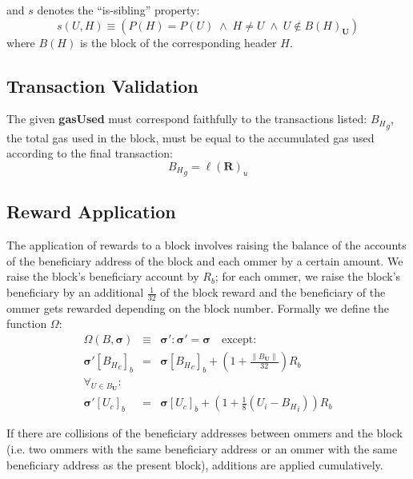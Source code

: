 \documentclass[9pt,oneside]{amsart}
\begin{document}
\begin{multicols}{2}
and $s$ denotes the ``is-sibling'' property:
\begin{equation}
s(U, H) \equiv (P(H) = P(U)\; \wedge \; H \neq U \; \wedge \; U \notin B(H)_\mathbf{U})
\end{equation}
where $B(H)$ is the block of the corresponding header $H$.

\subsection{Transaction Validation}


The given \textbf{gasUsed} must correspond faithfully to the transactions listed: ${B_H}_g$, the total gas used in the block, must be equal to the accumulated gas used according to the final transaction:
\begin{equation}
{B_H}_g = \ell(\mathbf{R})_u
\end{equation}

\subsection{Reward Application}

The application of rewards to a block involves raising the balance of the accounts of the beneficiary address of the block and each ommer by a certain amount. We raise the block's beneficiary account by $R_b$; for each ommer, we raise the block's beneficiary by an additional $\frac{1}{32}$ of the block reward and the beneficiary of the ommer gets rewarded depending on the block number. Formally we define the function $\Omega$:
\begin{eqnarray}
\Omega(B, \boldsymbol{\sigma}) & \equiv & \boldsymbol{\sigma}': \boldsymbol{\sigma}' = \boldsymbol{\sigma} \quad \text{except:} \\
\boldsymbol{\sigma}'[{B_H}_c]_b & = & \boldsymbol{\sigma}[{B_H}_c]_b + (1 + \frac{\lVert B_\mathbf{U}\rVert}{32})R_b \\
\forall_{U \in B_\mathbf{U}}: \\ \nonumber
 \boldsymbol{\sigma}'[U_c]_b & = & \boldsymbol{\sigma}[U_c]_b + (1 + \frac{1}{8} (U_i - {B_H}_i)) R_b
\end{eqnarray}

If there are collisions of the beneficiary addresses between ommers and the block (i.e. two ommers with the same beneficiary address or an ommer with the same beneficiary address as the present block), additions are applied cumulatively.


\end{multicols}
\end{document}
